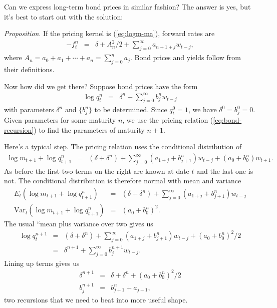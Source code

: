 \documentclass[11pt]{article}
\begin{document}
Can we express long-term bond prices in similar fashion?
The answer is yes,
but it's best to start out with the solution:

{\it Proposition\/}.  If the pricing kernel is (\ref{eq:logm-ma}),
forward rates are
\begin{eqnarray}
    - f^n_t &=& \delta + A_n^2/2 + \sum_{j=0}^\infty a_{n+1+j} w_{t-j} ,
\end{eqnarray}
where $A_n = a_0 + a_1 + \cdots + a_n = \sum_{j=0}^n a_j $.
Bond prices and yields follow from their definitions.

Now how did we get there?
Suppose bond prices have the form
\begin{eqnarray*}
    \log q^n_t &=& \delta^n + \sum_{j=0}^\infty b^n_{j} w_{t-j}
\end{eqnarray*}
with parameters $\delta^n$ and $\{b^n_j \}$ to be determined.
Since $q^0_t = 1$, we have $\delta^0 =b^0_j = 0$.
Given parameters for some maturity $n$,
we use the pricing relation (\ref{eq:bond-recursion})
to find the parameters of maturity $n+1$.


Here's a typical step.
The pricing relation uses the conditional distribution of
\begin{eqnarray*}
    \log m_{t+1} + \log q^n_{t+1} &=&  (\delta + \delta^n)
                + \sum_{j=0}^\infty (a_{1+j} + b^n_{j+1}) w_{t-j}
                + (a_0 + b^n_0) w_{t+1} .
\end{eqnarray*}
As before the first two terms on the right are known at date $t$
and the last one is not.
The conditional distribution is therefore normal with mean and variance
\begin{eqnarray*}
  E_t (  \log m_{t+1} + \log q^n_{t+1})  &=&  (\delta + \delta^n)
                + \sum_{j=0}^\infty (a_{1+j} + b^n_{j+1}) w_{t-j} \\
  \mbox{Var}_t (  \log m_{t+1} + \log q^n_{t+1})
                &=&  (a_0 + b^n_0)^2  .
\end{eqnarray*}
The usual ``mean plus variance over two gives us
\begin{eqnarray*}
  \log q^{n+1}_t  &=&  (\delta + \delta^n)
                + \sum_{j=0}^\infty (a_{1+j} + b^n_{j+1}) w_{t-j} +
             (a_0 + b^n_0)^2 / 2 \\
                &=& \delta^{n+1} + \sum_{j=0}^\infty b^{n+1}_{j} w_{t-j} .
\end{eqnarray*}
Lining up terms gives us
\begin{eqnarray*}
    \delta^{n+1} &=& \delta + \delta^n + (a_0 + b_0^n)^2/2\\
    b_j^{n+1} &=& b_{j+1}^{n} + a_{j+1} ,
\end{eqnarray*}
two recursions that we need to beat into more useful shape.
\end{document}
